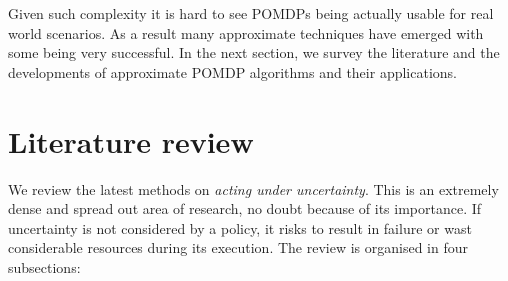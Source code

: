Given such complexity it is hard to see POMDPs being actually usable for real world scenarios. As a result many approximate 
techniques have emerged with some being very successful. In the next section, we survey the literature 
and the developments of approximate POMDP algorithms and their applications.







\section{Literature review}\label{sec:lit_rev}

We review the latest methods on \textit{acting under uncertainty}. This is an extremely dense and spread out area of research, 
no doubt because of its importance. If uncertainty is not considered by a policy, it risks to result in failure or wast considerable
resources during its execution. The review is organised in four subsections:

